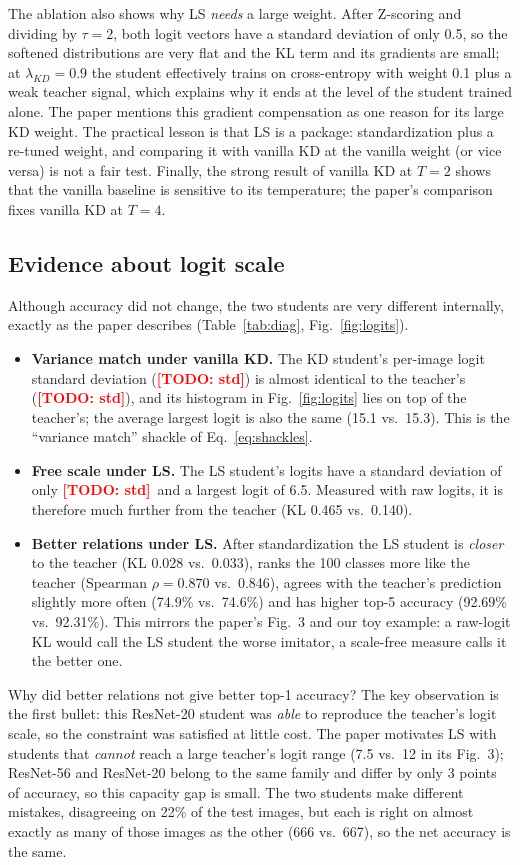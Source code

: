 \documentclass[12pt,a4paper]{article}
\newcommand{\TODO}[1]{\textcolor{red}{\textbf{[TODO: #1]}}}
\newcommand{\KDlogitstd}{\TODO{std}}
\newcommand{\LSlogitstd}{\TODO{std}}
\newcommand{\Tlogitstd}{\TODO{std}}
\begin{document}
The ablation also shows why LS \emph{needs} a large weight. After Z-scoring and dividing by $\tau=2$, both logit vectors have a standard deviation of only 0.5, so the softened distributions are very flat and the KL term and its gradients are small; at $\lambda_{KD}=0.9$ the student effectively trains on cross-entropy with weight 0.1 plus a weak teacher signal, which explains why it ends at the level of the student trained alone. The paper mentions this gradient compensation as one reason for its large KD weight. The practical lesson is that LS is a package: standardization plus a re-tuned weight, and comparing it with vanilla KD at the vanilla weight (or vice versa) is not a fair test. Finally, the strong result of vanilla KD at $T=2$ shows that the vanilla baseline is sensitive to its temperature; the paper's comparison fixes vanilla KD at $T=4$.

\subsection{Evidence about logit scale}
\label{sec:scale}
Although accuracy did not change, the two students are very different internally, exactly as the paper describes (Table~\ref{tab:diag}, Fig.~\ref{fig:logits}).
\begin{itemize}[nosep]
\item \textbf{Variance match under vanilla KD.} The KD student's per-image logit standard deviation (\KDlogitstd) is almost identical to the teacher's (\Tlogitstd), and its histogram in Fig.~\ref{fig:logits} lies on top of the teacher's; the average largest logit is also the same (15.1 vs.\ 15.3). This is the ``variance match'' shackle of Eq.~\eqref{eq:shackles}.
\item \textbf{Free scale under LS.} The LS student's logits have a standard deviation of only \LSlogitstd\ and a largest logit of 6.5. Measured with raw logits, it is therefore much further from the teacher (KL 0.465 vs.\ 0.140).
\item \textbf{Better relations under LS.} After standardization the LS student is \emph{closer} to the teacher (KL 0.028 vs.\ 0.033), ranks the 100 classes more like the teacher (Spearman $\rho=0.870$ vs.\ 0.846), agrees with the teacher's prediction slightly more often (74.9\% vs.\ 74.6\%) and has higher top-5 accuracy (92.69\% vs.\ 92.31\%). This mirrors the paper's Fig.~3 and our toy example: a raw-logit KL would call the LS student the worse imitator, a scale-free measure calls it the better one.
\end{itemize}
Why did better relations not give better top-1 accuracy? The key observation is the first bullet: this ResNet-20 student was \emph{able} to reproduce the teacher's logit scale, so the constraint was satisfied at little cost. The paper motivates LS with students that \emph{cannot} reach a large teacher's logit range (7.5 vs.\ 12 in its Fig.~3); ResNet-56 and ResNet-20 belong to the same family and differ by only 3 points of accuracy, so this capacity gap is small. The two students make different mistakes, disagreeing on 22\% of the test images, but each is right on almost exactly as many of those images as the other (666 vs.\ 667), so the net accuracy is the same.
\end{document}
